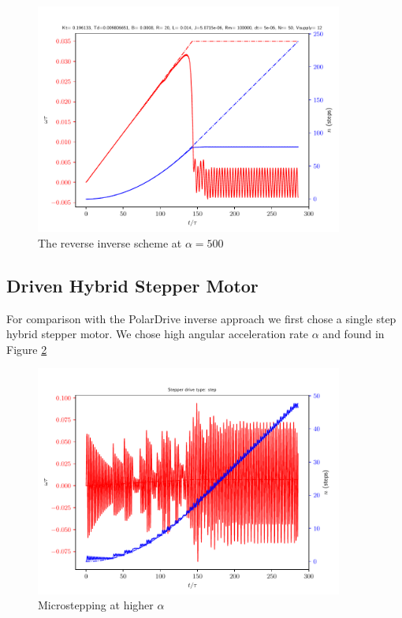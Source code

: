 \documentclass{article}
\begin{document}
\begin{figure}[h!]
  \centering
  \includegraphics[width=0.9\textwidth]{simfigs/fig1-2018-10-20T14-37-59-reverse-alpha-500.pdf}
  \captionsetup{justification=centering}
  \caption{The reverse inverse scheme at $\alpha=500$}
   \label{fig:rev-alpha-500}
\end{figure}

\subsection{Driven Hybrid Stepper Motor}
For comparison with the PolarDrive inverse approach we first chose a single step hybrid stepper motor. We chose high angular acceleration rate $\alpha$ and found in Figure \ref{fig:step-alpha-100}

\begin{figure}[h!]
  \centering
  \includegraphics[width=0.9\textwidth]{simfigs/fig1-2018-10-20T14-16-17-step-alpha-100.pdf}
  \captionsetup{justification=centering}
  \caption{Microstepping at higher $\alpha$}
   \label{fig:step-alpha-100}
\end{figure}
\end{document}
